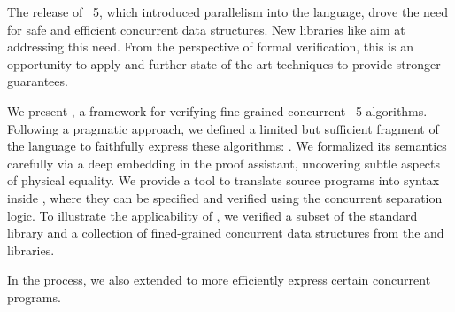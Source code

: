 The release of \OCaml~5, which introduced parallelism into the language, drove the need for safe and efficient concurrent data structures.
New libraries like \Saturn aim at addressing this need.
From the perspective of formal verification, this is an opportunity to apply and further state-of-the-art techniques to provide stronger guarantees.

We present \Zoo, a framework for verifying fine-grained concurrent \OCaml~5 algorithms.
Following a pragmatic approach, we defined a limited but sufficient fragment of the language to faithfully express these algorithms: \ZooLang.
We formalized its semantics carefully via a deep embedding in the \Rocq proof assistant, uncovering subtle aspects of physical equality.
We provide a tool to translate source \OCaml programs into \ZooLang syntax inside \Rocq, where they can be specified and verified using the \Iris concurrent separation logic.
To illustrate the applicability of \Zoo, we verified a subset of the standard library and a collection of fined-grained concurrent data structures from the \Saturn and \Eio libraries.

In the process, we also extended \OCaml to more efficiently express certain concurrent programs.
